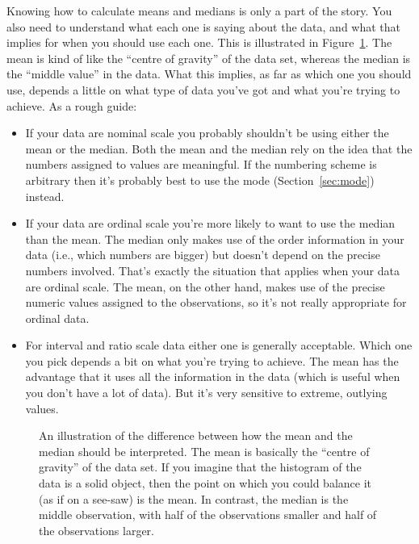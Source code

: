 
Knowing how to calculate means and medians is only a part of the story. You also need to understand what each one is saying about the data, and what that implies for when you should use each one. This is illustrated in Figure~\ref{fig:meanmedian}. The mean is kind of like the ``centre of gravity'' of the data set, whereas the median is the ``middle value'' in the data. What this implies, as far as which one you should use, depends a little on what type of data you've got and what you're trying to achieve. As a rough guide:
\begin{itemize} 
\item If your data are nominal scale you probably shouldn't be using either the mean or the median. Both the mean and the median rely on the idea that the numbers assigned to values are meaningful. If the numbering scheme is arbitrary then it's probably best to use the mode (Section~\ref{sec:mode}) instead. 
\item If your data are ordinal scale you're more likely to want to use the median than the mean. The median only makes use of the order information in your data (i.e., which numbers are bigger) but doesn't depend on the precise numbers involved. That's exactly the situation that applies when your data are ordinal scale. The mean, on the other hand, makes use of the precise numeric values assigned to the observations, so it's not really appropriate for ordinal data.
\item For interval and ratio scale data either one is generally acceptable. Which one you pick depends a bit on what you're trying to achieve. The mean has the advantage that it uses all the information in the data (which is useful when you don't have a lot of data). But it's very sensitive to extreme, outlying  values.  
\end{itemize}

\vspace{0.5cm}
\begin{figure}[htb]
\begin{center}
\caption{An illustration of the difference between how the mean and the median should be interpreted. The mean is basically the ``centre of gravity'' of the data set. If you imagine that the histogram of the data is a solid object, then the point on which you could balance it (as if on a see-saw) is the mean. In contrast, the median is the middle observation, with half of the observations smaller and half of the observations larger.}
\HR
\label{fig:meanmedian}
\end{center}
\end{figure}

